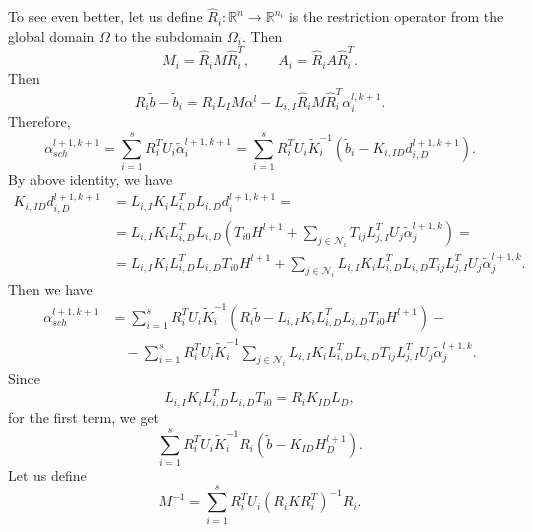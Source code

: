 \documentclass[a4paper, 11pt]{article}
\theoremstyle{plain}
\theoremstyle{definition}
\theoremstyle{remark}
\begin{document}
To see even better, let us define $\hat{R}_{i}: \mathbb{R}^{n} \to \mathbb{R}^{n_i}$ is the restriction operator from the global domain $\Omega$ to the subdomain $\Omega_{i}$. Then
\begin{equation*}
    M_{i} = \hat{R}_{i}M\hat{R}_{i}^{T}, \qquad A_{i} = \hat{R}_{i}A\hat{R}_{i}^{T}.
\end{equation*}
Then 
\begin{equation*}
    R_{i}\tilde{b} - \tilde{b}_{i} = R_{i}L_{I}M \alpha^{l} - L_{i, I}\hat{R}_{i}M\hat{R}_{i}^{T} \alpha_{i}^{l, k+1}.
\end{equation*}
Therefore,
\begin{equation*}
    \alpha_{sch}^{l+1, k+1} = \sum_{i = 1}^{s}R_{i}^{T}U_{i}\tilde{\alpha}^{l+1, k + 1}_{i} = \sum_{i = 1}^{s}R_{i}^{T}U_{i}\tilde{K}_{i}^{-1}\left(\tilde{b}_{i} - K_{i, ID}d^{l+1, k+1}_{i, D}\right).
\end{equation*}
By above identity, we have
\begin{align*}
    K_{i, ID}d^{l+1, k+1}_{i, D} &= L_{i, I}K_{i}L_{i, D}^{T}L_{i, D}d^{l+1, k+1}_{i} =\\
    &= L_{i, I}K_{i}L_{i, D}^{T}L_{i, D}\left(T_{i0}H^{l+1} + \sum_{j\in\mathcal{N}_{i}}T_{ij}L_{j, I}^{T}U_{j}\tilde{\alpha}^{l+1, k}_{j}\right) =\\
    &= L_{i, I}K_{i}L_{i, D}^{T}L_{i, D}T_{i0}H^{l+1} + \sum_{j\in\mathcal{N}_{i}}L_{i, I}K_{i}L_{i, D}^{T}L_{i, D}T_{ij}L_{j, I}^{T}U_{j}\tilde{\alpha}^{l+1, k}_{j}.
\end{align*}
Then we have
\begin{align*}
    \alpha_{sch}^{l+1, k+1} & = \sum_{i = 1}^{s}R_{i}^{T}U_{i}\tilde{K}_{i}^{-1}\left(R_{i}\tilde{b} - L_{i, I}K_{i}L_{i, D}^{T}L_{i, D}T_{i0}H^{l+1}\right) -\\
    &\quad-\sum_{i=1}^{s}R_{i}^{T}U_{i}\tilde{K}_{i}^{-1}\sum_{j\in\mathcal{N}_{i}}L_{i, I}K_{i}L_{i, D}^{T}L_{i, D}T_{ij}L_{j, I}^{T}U_{j}\tilde{\alpha}^{l+1, k}_{j}.
\end{align*}
Since
\begin{equation*}
    L_{i, I}K_{i}L_{i, D}^{T}L_{i, D}T_{i0} = R_{i}K_{ID}L_{D},
\end{equation*}
for the first term, we get
\begin{equation*}
    \sum_{i = 1}^{s}R_{i}^{T}U_{i}\tilde{K}_{i}^{-1}R_{i}\left(\tilde{b} - K_{ID}H^{l+1}_{D}\right).
\end{equation*}
Let us define
\begin{equation*}
    M^{-1} = \sum_{i=1}^{s} R^{T}_{i}U_{i}\left(R_{i}KR_{i}^{T}\right)^{-1}R_{i}.
\end{equation*}
\end{document}
